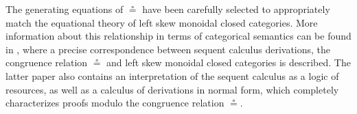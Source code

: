 \documentclass[sn-mathphys-num]{sn-jnl}%
\newcommand{\tl}{\otimes \mathsf{L}}
\newcommand{\tr}{\otimes\mathsf{R}}
\newcommand{\pass}{\mathsf{pass}}
\newcommand{\unitl}{\mathsf{IL}}
\newcommand{\unitr}{\mathsf{IR}}
\newcommand{\ax}{\mathsf{ax}}
\newcommand{\ot}{\otimes}
\newcommand{\lolli}{\multimap}
\newcommand{\lleft}{{\lolli}\mathsf{L}}
\newcommand{\lright}{{\lolli}\mathsf{R}}
\newcommand{\unit}{\mathsf{I}}
\theoremstyle{thmstyleone}%
\theoremstyle{thmstyletwo}%
\theoremstyle{thmstylethree}%
\begin{document}

The generating equations of $\circeq$ have been carefully selected to appropriately match the equational theory of left skew monoidal closed categories. More information about this relationship in terms of categorical semantics can be found in \cite{UVW:protsn}, where a precise correspondence between sequent calculus derivations, the congruence relation $\circeq$ and left skew monoidal closed categories is described.
The latter paper also contains an interpretation of the sequent calculus as a logic of resources, as well as a calculus of derivations in normal form, which completely characterizes proofs modulo the congruence relation $\circeq$.
\end{document}
